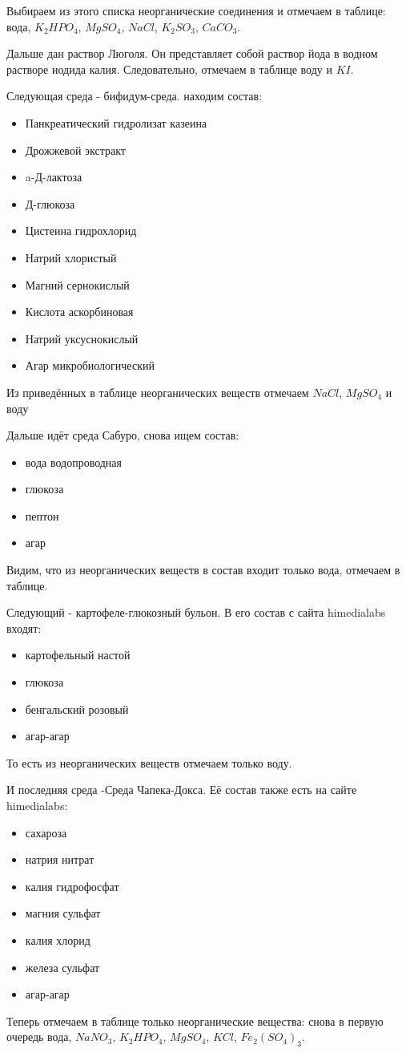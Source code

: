 Выбираем из этого списка неорганические соединения и отмечаем в таблице: вода, $K_2HPO_4$, $MgSO_4$, $NaCl$, $K_2SO_3$, $CaCO_3$.

Дальше дан раствор Люголя. Он представляет собой раствор йода в водном растворе иодида калия. Следовательно, отмечаем в таблице воду и $KI$.

Следующая среда - бифидум-среда. находим состав:
\begin{itemize}
    \item Панкреатический гидролизат казеина
    \item Дрожжевой экстракт 
    \item a-Д-лактоза 
    \item Д-глюкоза
    \item Цистеина гидрохлорид 
    \item Натрий хлористый  
    \item Магний сернокислый 
    \item Кислота аскорбиновая
    \item Натрий уксуснокислый
    \item Агар микробиологический
\end{itemize}

Из приведённых в таблице неорганических веществ отмечаем $NaCl$, $MgSO_4$ и воду

Дальше идёт среда Сабуро, снова ищем состав:
\begin{itemize}
    \item вода водопроводная 
    \item глюкоза
    \item пептон
    \item агар 
\end{itemize}

Видим, что из неорганических веществ в состав входит только вода, отмечаем в таблице.

Следующий - картофеле-глюкозный бульон. В его состав с сайта himedialabs входят:
\begin{itemize}
    \item картофельный настой
    \item глюкоза
    \item бенгальский розовый
    \item агар-агар
\end{itemize}

То есть из неорганических веществ отмечаем только воду.

И последняя среда -Среда Чапека-Докса. Её состав также есть на сайте himedialabs:
\begin{itemize}
    \item сахароза
    \item натрия нитрат
    \item калия гидрофосфат
    \item магния сульфат
    \item калия хлорид
    \item железа сульфат
    \item агар-агар
\end{itemize}

Теперь отмечаем в таблице только неорганические вещества: снова в первую очередь вода, $NaNO_3$, $K_2HPO_4$, $MgSO_4$, $KCl$, $Fe_2(SO_4)_3$.